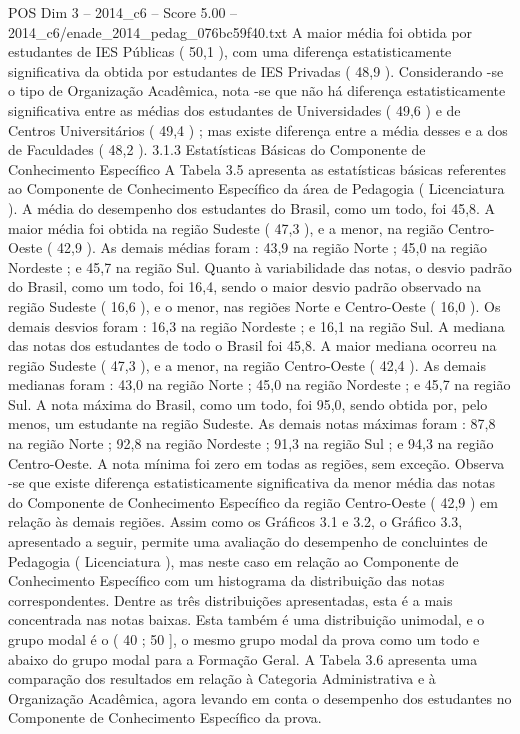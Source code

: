 \begin{textsample}{POS Dim 3 – 2014\_c6 – Score 5.00 – 2014\_c6/enade\_2014\_pedag\_076bc59f40.txt}
A maior média foi obtida por estudantes de IES Públicas ( 50,1 ), com uma diferença estatisticamente significativa da obtida por estudantes de IES Privadas ( 48,9 ).
Considerando -se o tipo de Organização Acadêmica, nota -se que não há diferença estatisticamente significativa entre as médias dos estudantes de Universidades ( 49,6 ) e de Centros Universitários ( 49,4 ) ; mas existe diferença entre a média desses e a dos de Faculdades ( 48,2 ). 3.1.3 Estatísticas Básicas do Componente de Conhecimento Específico A Tabela 3.5 apresenta as estatísticas básicas referentes ao Componente de Conhecimento Específico da área de Pedagogia ( Licenciatura ).
A média do desempenho dos estudantes do Brasil, como um todo, foi 45,8.
A maior média foi obtida na região Sudeste ( 47,3 ), e a menor, na região Centro-Oeste ( 42,9 ).
As demais médias foram : 43,9 na região Norte ; 45,0 na região Nordeste ; e 45,7 na região Sul.
Quanto à variabilidade das notas, o desvio padrão do Brasil, como um todo, foi 16,4, sendo o maior desvio padrão observado na região Sudeste ( 16,6 ), e o menor, nas regiões Norte e Centro-Oeste ( 16,0 ).
Os demais desvios foram : 16,3 na região Nordeste ; e 16,1 na região Sul.
A mediana das notas dos estudantes de todo o Brasil foi 45,8.
A maior mediana ocorreu na região Sudeste ( 47,3 ), e a menor, na região Centro-Oeste ( 42,4 ).
As demais medianas foram : 43,0 na região Norte ; 45,0 na região Nordeste ; e 45,7 na região Sul.
A nota máxima do Brasil, como um todo, foi 95,0, sendo obtida por, pelo menos, um estudante na região Sudeste.
As demais notas máximas foram : 87,8 na região Norte ; 92,8 na região Nordeste ; 91,3 na região Sul ; e 94,3 na região Centro-Oeste.
A nota mínima foi zero em todas as regiões, sem exceção.
Observa -se que existe diferença estatisticamente significativa da menor média das notas do Componente de Conhecimento Específico da região Centro-Oeste ( 42,9 ) em relação às demais regiões.
Assim como os Gráficos 3.1 e 3.2, o Gráfico 3.3, apresentado a seguir, permite uma avaliação do desempenho de concluintes de Pedagogia ( Licenciatura ), mas neste caso em relação ao Componente de Conhecimento Específico com um histograma da distribuição das notas correspondentes.
Dentre as três distribuições apresentadas, esta é a mais concentrada nas notas baixas.
Esta também é uma distribuição unimodal, e o grupo modal é o ( 40 ; 50 ], o mesmo grupo modal da prova como um todo e abaixo do grupo modal para a Formação Geral.
A Tabela 3.6 apresenta uma comparação dos resultados em relação à Categoria Administrativa e à Organização Acadêmica, agora levando em conta o desempenho dos estudantes no Componente de Conhecimento Específico da prova.

\end{textsample}
